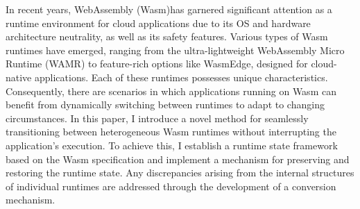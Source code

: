 In recent years, WebAssembly (Wasm)has garnered significant attention as a runtime environment for cloud applications due to its OS and hardware architecture neutrality, as well as its safety features. Various types of Wasm runtimes have emerged, ranging from the ultra-lightweight WebAssembly Micro Runtime (WAMR) to feature-rich options like WasmEdge, designed for cloud-native applications. Each of these runtimes possesses unique characteristics. Consequently, there are scenarios in which applications running on Wasm can benefit from dynamically switching between runtimes to adapt to changing circumstances.
In this paper, I introduce a novel method for seamlessly transitioning between heterogeneous Wasm runtimes without interrupting the application's execution. To achieve this, I establish a runtime state framework based on the Wasm specification and implement a mechanism for preserving and restoring the runtime state. Any discrepancies arising from the internal structures of individual runtimes are addressed through the development of a conversion mechanism.